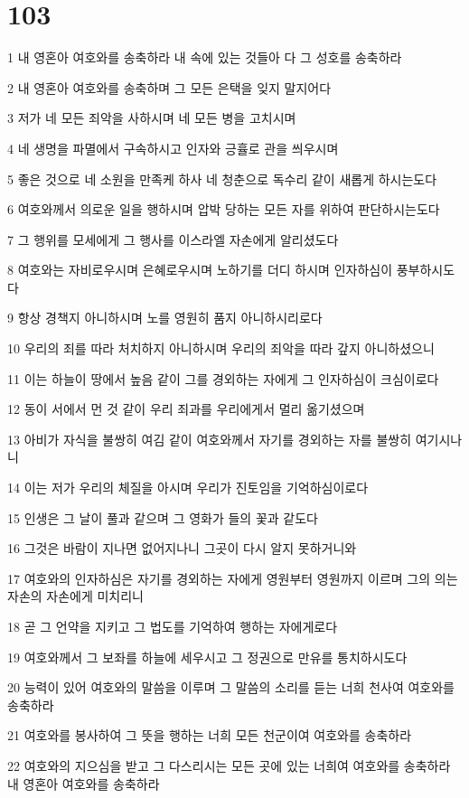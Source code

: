 \chapter{103}

\par 1 내 영혼아 여호와를 송축하라 내 속에 있는 것들아 다 그 성호를 송축하라
\par 2 내 영혼아 여호와를 송축하며 그 모든 은택을 잊지 말지어다
\par 3 저가 네 모든 죄악을 사하시며 네 모든 병을 고치시며
\par 4 네 생명을 파멸에서 구속하시고 인자와 긍휼로 관을 씌우시며
\par 5 좋은 것으로 네 소원을 만족케 하사 네 청춘으로 독수리 같이 새롭게 하시는도다
\par 6 여호와께서 의로운 일을 행하시며 압박 당하는 모든 자를 위하여 판단하시는도다
\par 7 그 행위를 모세에게 그 행사를 이스라엘 자손에게 알리셨도다
\par 8 여호와는 자비로우시며 은혜로우시며 노하기를 더디 하시며 인자하심이 풍부하시도다
\par 9 항상 경책지 아니하시며 노를 영원히 품지 아니하시리로다
\par 10 우리의 죄를 따라 처치하지 아니하시며 우리의 죄악을 따라 갚지 아니하셨으니
\par 11 이는 하늘이 땅에서 높음 같이 그를 경외하는 자에게 그 인자하심이 크심이로다
\par 12 동이 서에서 먼 것 같이 우리 죄과를 우리에게서 멀리 옮기셨으며
\par 13 아비가 자식을 불쌍히 여김 같이 여호와께서 자기를 경외하는 자를 불쌍히 여기시나니
\par 14 이는 저가 우리의 체질을 아시며 우리가 진토임을 기억하심이로다
\par 15 인생은 그 날이 풀과 같으며 그 영화가 들의 꽃과 같도다
\par 16 그것은 바람이 지나면 없어지나니 그곳이 다시 알지 못하거니와
\par 17 여호와의 인자하심은 자기를 경외하는 자에게 영원부터 영원까지 이르며 그의 의는 자손의 자손에게 미치리니
\par 18 곧 그 언약을 지키고 그 법도를 기억하여 행하는 자에게로다
\par 19 여호와께서 그 보좌를 하늘에 세우시고 그 정권으로 만유를 통치하시도다
\par 20 능력이 있어 여호와의 말씀을 이루며 그 말씀의 소리를 듣는 너희 천사여 여호와를 송축하라
\par 21 여호와를 봉사하여 그 뜻을 행하는 너희 모든 천군이여 여호와를 송축하라
\par 22 여호와의 지으심을 받고 그 다스리시는 모든 곳에 있는 너희여 여호와를 송축하라 내 영혼아 여호와를 송축하라

